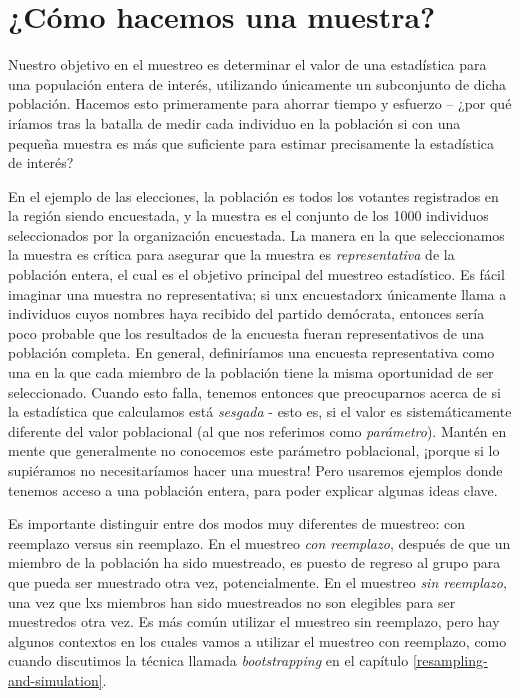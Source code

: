 \documentclass[
  12pt,
]{book}
\begin{document}
\hypertarget{how-do-we-sample}{%
\section{¿Cómo hacemos una muestra?}\label{how-do-we-sample}}

Nuestro objetivo en el muestreo es determinar el valor de una estadística para una populación entera de interés, utilizando únicamente un subconjunto de dicha población. Hacemos esto primeramente para ahorrar tiempo y esfuerzo -- ¿por qué iríamos tras la batalla de medir cada individuo en la población si con una pequeña muestra es más que suficiente para estimar precisamente la estadística de interés?

En el ejemplo de las elecciones, la población es todos los votantes registrados en la región siendo encuestada, y la muestra es el conjunto de los 1000 individuos seleccionados por la organización encuestada. La manera en la que seleccionamos la muestra es crítica para asegurar que la muestra es \emph{representativa} de la población entera, el cual es el objetivo principal del muestreo estadístico. Es fácil imaginar una muestra no representativa; si unx encuestadorx únicamente llama a individuos cuyos nombres haya recibido del partido demócrata, entonces sería poco probable que los resultados de la encuesta fueran representativos de una población completa. En general, definiríamos una encuesta representativa como una en la que cada miembro de la población tiene la misma oportunidad de ser seleccionado. Cuando esto falla, tenemos entonces que preocuparnos acerca de si la estadística que calculamos está \emph{sesgada} - esto es, si el valor es sistemáticamente diferente del valor poblacional (al que nos referimos como \emph{parámetro}). Mantén en mente que generalmente no conocemos este parámetro poblacional, ¡porque si lo supiéramos no necesitaríamos hacer una muestra! Pero usaremos ejemplos donde tenemos acceso a una población entera, para poder explicar algunas ideas clave.

Es importante distinguir entre dos modos muy diferentes de muestreo: con reemplazo versus sin reemplazo. En el muestreo \emph{con reemplazo}, después de que un miembro de la población ha sido muestreado, es puesto de regreso al grupo para que pueda ser muestrado otra vez, potencialmente. En el muestreo \emph{sin reemplazo}, una vez que lxs miembros han sido muestreados no son elegibles para ser muestredos otra vez. Es más común utilizar el muestreo sin reemplazo, pero hay algunos contextos en los cuales vamos a utilizar el muestreo con reemplazo, como cuando discutimos la técnica llamada \emph{bootstrapping} en el capítulo \ref{resampling-and-simulation}.
\end{document}
